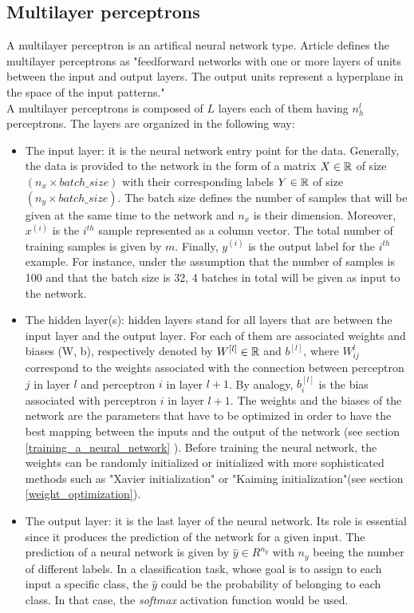 \subsection{Multilayer perceptrons}
\label{multilayer_perceptron}
A multilayer perceptron is an artifical neural network type. Article \cite{23} defines the multilayer perceptrons as "feedforward networks with one or more layers of units between the
input and output layers. The output units represent a hyperplane in the space
of the input patterns."\\
A multilayer perceptrons is composed of $L$ layers each of them having $n^{l}_{h}$ perceptrons. The layers are organized in the following way:
\begin{itemize}
\item The input layer: it is the neural network entry point for the data. Generally, the data is provided to the network in the form of a matrix $X \in \mathbb{R}$ of size $(n_{x} \times batch\_size)$ with their corresponding labels $Y \in \mathbb{R}$ of size $(n_{y} \times batch\_size)$. The batch size defines the number of samples that will be given at the same time to the network and $n_{x}$ is their dimension. Moreover, $x^{(i)}$ is the $i^{th}$ sample represented as a column vector. The total number of training samples is given by $m$. Finally, $y^{(i)}$ is the output label for the $i^{th}$ example. For instance, under the assumption that the number of samples is 100 and that the batch size is 32, 4 batches in total will be given as input to the network.
\item The hidden layer(s): hidden layers stand for all layers that are between the input layer and the output layer. For each of them are associated weights and biases (W, b), respectively denoted by $W^{[l]} \in \mathbb{R} $ and $b^{[l]}$, where $W_{ij}^{l}$ correspond to the weights associated with the connection between perceptron $j$ in layer $l$ and perceptron $i$ in layer $l+1$. By analogy, $b_{i}^{[l]}$ is the bias associated with perceptron $i$ in layer $l+1$. The weights and the biases of the network are the parameters that have to be optimized in order to have the best mapping between the inputs and the output of the network (see section \ref{training_a_neural_network} ). Before training the neural network, the weights can be randomly initialized or initialized with more sophisticated methods such as "Xavier initialization" or "Kaiming initialization"(see section \ref{weight_optimization}).
\item The output layer: it is the last layer of the neural network. Its role is essential since it produces the prediction of the network for a given input. The prediction of a neural network is given by $\hat{y} \in R^{n_{y}}$ with $n_{y}$ beeing the number of different labels. In a classification task, whose goal is to assign to each input a specific class, the $\hat{y}$ could be the probability of belonging to each class. In that case, the \textit{softmax} activation function would be used.
\end{itemize}
